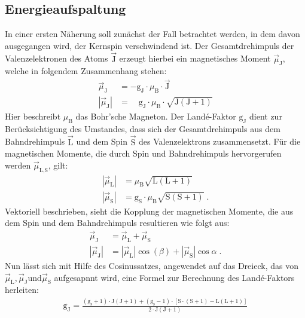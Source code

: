 \subsection{Energieaufspaltung}
In einer ersten Näherung soll zunächst der Fall betrachtet werden, in dem davon ausgegangen wird, der
Kernspin verschwindend ist.
Der Gesamtdrehimpuls der Valenzelektronen des Atoms $\vec{\text{J}}$ erzeugt hierbei
ein magnetisches Moment $\vec{\mu}_{\text{J}}$, welche in folgendem Zusammenhang stehen:
\begin{align*}
    \vec{\mu}_{\text{J}} &= -\text{g}_{\text{J}} \cdot \mu_{\text{B}} \cdot \vec{\text{J}} \\
    |\vec{\mu}_{\text{J}}| &= \hspace{1em} \text{g}_{\text{J}} \cdot \mu_{\text{B}} \cdot \sqrt{ \text{J} (\text{J}+1) }
\end{align*}
Hier beschreibt $\mu_{\text{B}}$ das Bohr'sche Magneton.
Der Landé-Faktor $\text{g}_{\text{J}}$ dient zur Berücksichtigung des Umstandes, dass sich der Gesamtdrehimpuls aus dem Bahndrehimpuls $\vec{\text{L}}$ und dem Spin $\vec{\text{S}}$ des Valenzelektrons zusammensetzt.
Für die magnetischen Momente, die durch Spin und Bahndrehimpuls hervorgerufen werden $\vec{\mu}_{\text{L,S}}$, gilt:
\begin{align*}
    |\vec{\mu}_{\text{L}}| &= \mu_{\text{B}} \sqrt{\text{L} (\text{L}+1)} \\
    |\vec{\mu}_{\text{S}}| &= \text{g}_{\text{S}} \cdot \mu_{\text{B}} \sqrt{\text{S}(\text{S}+1)} \; .
\end{align*}
Vektoriell beschrieben, sieht die Kopplung der magnetischen Momente, die aus dem Spin und dem Bahndrehimpuls resultieren wie folgt aus:
\begin{align*}
    \vec{\mu}_{\text{J}} &= \vec{\mu}_{\text{L}} + \vec{\mu}_{\text{S}} \\
    |\vec{\mu}_{\text{J}}| &= |\vec{\mu}_{\text{L}}| \cos(\beta) + |\vec{\mu}_{\text{S}}| \cos{\alpha} \; .
\end{align*}
Nun lässt sich mit Hilfe des Cosinussatzes, angewendet auf das Dreieck, das von $\vec{\mu}_{\text{L}}, \vec{\mu}_{\text{J}} \text{und} \vec{\mu}_{\text{S}}$ aufgesapnnt wird, eine Formel zur Berechnung des Landé-Faktors herleiten:
\begin{align}
    \text{g}_{\text{J}} = \frac{(\text{g}_{\text{s}} + 1) \cdot \text{J} (\text{J} + 1) + (\text{g}_{\text{s}}-1) \cdot \left[\text{S}
    \cdot (\text{S}+1) - \text{L} (\text{L} + 1) \right]}{2 \cdot \text{J} (\text{J} +1 )}
    \label{eq:La-Fa.gj}
\end{align}
